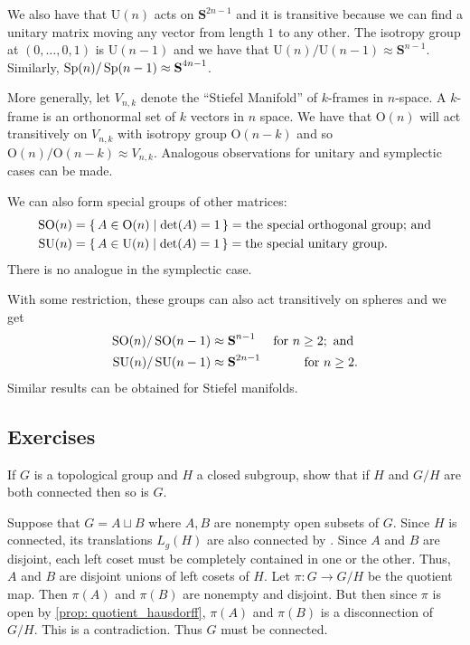 \documentclass[letterpaper, 11pt, oneside]{book}
\begin{document}
We also have that $\text{U}(n)$ acts on $\textbf{S}^{2n - 1}$  and it is transitive because we can find a unitary matrix moving any vector from length $1$ to any other.
The isotropy group at $(0, \ldots, 0, 1)$ is $\text{U}(n - 1)$ and we have that $\text{U}(n) / \text{U}(n - 1) \approx \textbf{S}^{n - 1}$.
Similarly, $\operatorname{Sp}(n) / \operatorname{Sp}(n - 1) \approx \textbf{S}^{4n - 1}$.

More generally, let $V_{n, k}$ denote the ``Stiefel Manifold'' of $k$-frames in $n$-space.
A $k$-frame is an orthonormal set of $k$ vectors in $n$ space.
We have that $\text{O}(n)$ will act transitively on $V_{n, k}$ with isotropy group $\text{O}(n - k)$ and so $\text{O}(n) / \text{O}(n - k) \approx V_{n, k}$.
Analogous observations for unitary and symplectic cases can be made.

We can also form special groups of other matrices:
\begin{align*}
  \operatorname{SO}(n) &= \set{A \in \text{O}(n) | \det(A) = 1} = \text{the special orthogonal group; and} \\
  \operatorname{SU}(n) &= \set{A \in \text{U}(n) | \det(A) = 1} = \text{the special unitary group.}
\end{align*}
There is no analogue in the symplectic case.

With some restriction, these groups can also act transitively on spheres and we get
\begin{align*}
  \operatorname{SO}(n) / \operatorname{SO}(n - 1) &\approx \textbf{S}^{n - 1} & \text{for } n \geq 2; \text{ and } \\
  \operatorname{SU}(n) / \operatorname{SU}(n - 1) &\approx \textbf{S}^{2n - 1} & \text{for } n \geq 2.
\end{align*}
Similar results can be obtained for Stiefel manifolds.

\clearpage

\subsection*{Exercises}

\begin{exercise}
  If $G$ is a topological group and $H$ a closed subgroup, show that if $H$ and $G / H$ are both connected then so is $G$.
\end{exercise}
\begin{pf}
  Suppose that $G = A \sqcup B$ where $A, B$ are nonempty open subsets of $G$.
  Since $H$ is connected, its translations $L_{g}(H)$ are also connected by .
  Since $A$ and $B$ are disjoint, each left coset must be completely contained in one or the other.
  Thus, $A$ and $B$ are disjoint unions of left cosets of $H$.
  Let $\pi\colon G \to G/H$ be the quotient map.
  Then $\pi(A)$ and $\pi(B)$ are nonempty and disjoint.
  But then since $\pi$ is open by \cref{prop: quotient_hausdorff}, $\pi(A)$ and $\pi(B)$ is a disconnection of $G / H$.
  This is a contradiction.
  Thus $G$ must be connected.
\end{pf}
\end{document}

